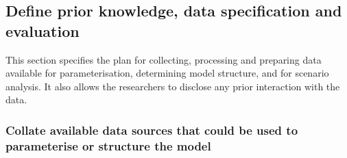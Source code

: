 \documentclass[
]{article}
\begin{document}
\subsection{Define prior knowledge, data specification and
evaluation}\label{define-prior-knowledge-data-specification-and-evaluation}

\begin{tcolorbox}[enhanced jigsaw, opacitybacktitle=0.6, bottomrule=.15mm, leftrule=.75mm, rightrule=.15mm, colbacktitle=quarto-callout-note-color!10!white, toprule=.15mm, titlerule=0mm, left=2mm, colframe=quarto-callout-note-color-frame, breakable, title=\textcolor{quarto-callout-note-color}{\faInfo}\hspace{0.5em}{Explanation}, opacityback=0, coltitle=black, bottomtitle=1mm, colback=white, toptitle=1mm, arc=.35mm]

This section specifies the plan for collecting, processing and preparing
data available for parameterisation, determining model structure, and
for scenario analysis. It also allows the researchers to disclose any
prior interaction with the data.

\end{tcolorbox}

\subsubsection{Collate available data sources that could be used to
parameterise or structure the
model}\label{collate-available-data-sources-that-could-be-used-to-parameterise-or-structure-the-model}
\end{document}
